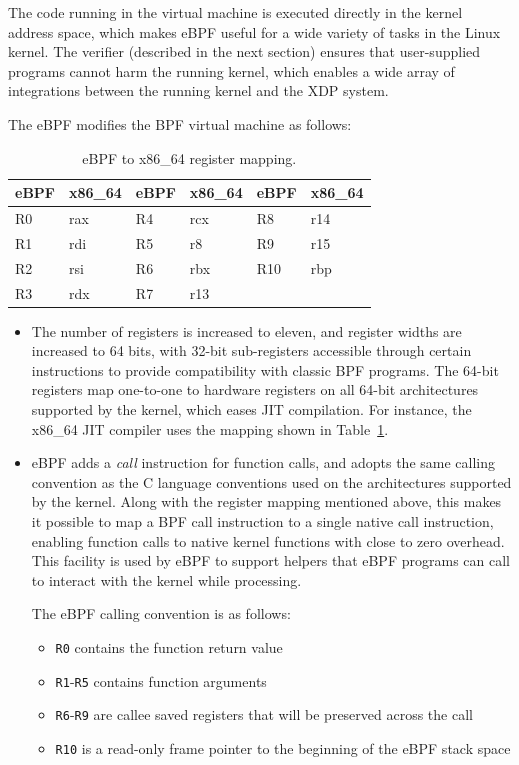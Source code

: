 \documentclass[10pt,sigconf]{acmart}
\begin{document}
The code running in the virtual machine is executed directly in the kernel
address space, which makes eBPF useful for a wide variety of tasks in the Linux
kernel. The verifier (described in the next section) ensures that user-supplied
programs cannot harm the running kernel, which enables a wide array of
integrations between the running kernel and the XDP system.

The eBPF modifies the BPF virtual machine as follows:

\begin{table}[tbp]
\caption{\label{tbl:reg-map}
eBPF to x86\_64 register mapping.}
\centering
\begin{tabular}{ll|ll|ll}
\toprule
eBPF & x86\_64 & eBPF & x86\_64 & eBPF & x86\_64\\
\midrule
R0 & rax & R4 & rcx & R8 & r14\\
R1 & rdi & R5 & r8 &  R9 & r15\\
R2 & rsi & R6 & rbx & R10 & rbp\\
R3 & rdx & R7 & r13\\
\bottomrule
\end{tabular}
\end{table}


\begin{itemize}
\item The number of registers is increased to eleven, and register widths are
increased to 64 bits, with 32-bit sub-registers accessible through certain
instructions to provide compatibility with classic BPF programs. The 64-bit
registers map one-to-one to hardware registers on all 64-bit architectures
supported by the kernel, which eases JIT compilation. For instance, the x86\_64
JIT compiler uses the mapping shown in Table~\ref{tbl:reg-map}.

\item eBPF adds a \emph{call} instruction for function calls, and adopts the same calling
convention as the C language conventions used on the architectures supported
by the kernel. Along with the register mapping mentioned above, this makes it
possible to map a BPF call instruction to a single native call instruction,
enabling function calls to native kernel functions with close to zero
overhead. This facility is used by eBPF to support helpers that eBPF programs
can call to interact with the kernel while processing.

The eBPF calling convention is as follows:
\begin{itemize}
\item \texttt{R0} contains the function return value
\item \texttt{R1}-\texttt{R5} contains function arguments
\item \texttt{R6}-\texttt{R9} are callee saved registers that will be preserved across the call
\item \texttt{R10} is a read-only frame pointer to the beginning of the eBPF stack space
\end{itemize}
\end{itemize}
\end{document}
